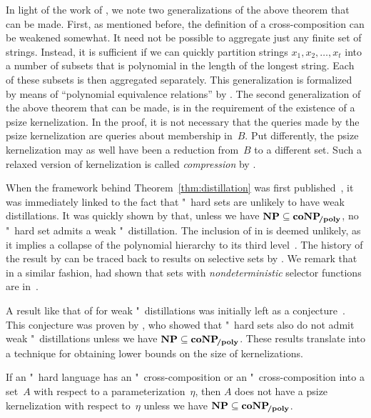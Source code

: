 In light of the work of \textcite{bodlaender2014kernelization}, we note two generalizations of the above theorem that can be made.
First, as mentioned before, the definition of a cross-composition can be weakened somewhat.
It need not be possible to aggregate just any finite set of strings.
Instead, it is sufficient if we can quickly partition strings $x_1, x_2, \ldots, x_t$ into a number of subsets that is polynomial in the length of the longest string.
Each of these subsets is then aggregated separately.
This generalization is formalized by means of \enquote{polynomial equivalence relations} by \textcite{bodlaender2014kernelization}.
The second generalization of the above theorem that can be made, is in the requirement of the existence of a psize kernelization.
In the proof, it is not necessary that the queries made by the psize kernelization are queries about membership in~$B$.
Put differently, the psize kernelization may as well have been a reduction from~$B$ to a different set.
Such a relaxed version of kernelization is called \emph{compression} by \textcite{bodlaender2014kernelization}.

When the framework behind Theorem~\ref{thm:distillation} was first published~\parencite{bodlaender2009problems}, it was immediately linked to the fact that "~hard sets are unlikely to have weak distillations.
It was quickly shown by \textcite{fortnow2011infeasibility} that, unless we have $\textnormal{\textbf{NP}} \subseteq \textnormal{\textbf{coNP}}\!_\textnormal{\textbf{/poly}}$, no "~hard set admits a weak "~distillation.
The inclusion of  in  is deemed unlikely, as it implies a collapse of the polynomial hierarchy to its third level~\parencite{yap1983some}.
The history of the result by \citeauthor{fortnow2011infeasibility} can be traced back to results on \pdash{}selective sets by \textcite{selman1979p-selective,ko1983self}.
We remark that in a similar fashion, \textcite{hemaspaandra1995nondeterministically} had shown that sets with \emph{nondeterministic} selector functions are in~.

A result like that of \citeauthor{fortnow2011infeasibility} for weak "~distillations was initially left as a conjecture~\parencite{bodlaender2009problems}.
This conjecture was proven by \textcite{drucker2015new}, who showed that "~hard sets also do not admit weak "~distillations unless we have $\textnormal{\textbf{NP}} \subseteq \textnormal{\textbf{coNP}}\!_\textnormal{\textbf{/poly}}$.
These results translate into a technique for obtaining lower bounds on the size of kernelizations.
\begin{corollary}
\label{cor:lower_bound}%
  If an "~hard language has an "~cross-composition or an "~cross-composition into a set~$A$ with respect to a parameterization~$\eta$, then $A$ does not have a psize kernelization with respect to~$\eta$ unless we have $\textnormal{\textbf{NP}} \subseteq \textnormal{\textbf{coNP}}\!_\textnormal{\textbf{/poly}}$.
\end{corollary}

